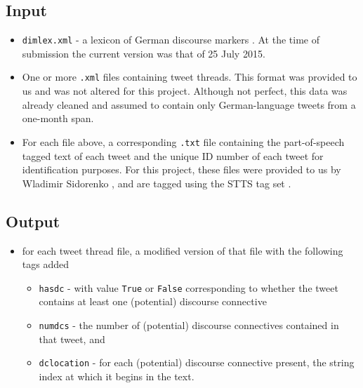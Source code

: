 \documentclass[11pt]{article}
\def\mono#1{\texttt{#1}}  %
\begin{document}
\subsection{Input}
\begin{itemize} 

\item \mono{dimlex.xml} - a lexicon of German discourse markers \cite{dimlex}.  At the time of submission the current version was that of 25 July 2015.

\item One or more \mono{.xml} files containing tweet threads.  This format was provided to us and was not altered for this project.  Although not perfect, this data was already cleaned and assumed to contain only German-language tweets from a one-month span.

\item For each file above, a corresponding \mono{.txt} file containing the part-of-speech tagged text of each tweet and the unique ID number of each tweet for identification purposes.  For this project, these files were provided to us by Wladimir Sidorenko \cite{WladimirSidorenko}, and are tagged using the STTS tag set \cite{stts}.
\end{itemize}

\subsection{Output}
\begin{itemize} 

\item for each tweet thread file, a modified version of that file with the following tags added
\begin{itemize} 

\item  \mono{has\textunderscore dc} - with value \mono{True} or \mono{False} corresponding to whether the tweet contains at least one (potential) discourse connective
\item  \mono{num\textunderscore dcs} - the number of (potential) discourse connectives contained in that tweet, and
\item  \mono{dc\textunderscore location} - for each (potential) discourse connective present, the string index at which it begins in the text.

\end{itemize} %

\end{itemize} %
\end{document}
